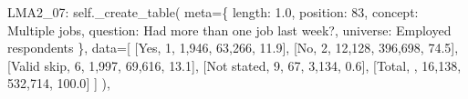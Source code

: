 \documentclass[
  11pt,
  a4paper,
]{article}
\newenvironment{Shaded}{\begin{snugshade}}{\end{snugshade}}
\newcommand{\NormalTok}[1]{\textcolor[rgb]{0.00,0.23,0.31}{#1}}
\newcommand{\OperatorTok}[1]{\textcolor[rgb]{0.37,0.37,0.37}{#1}}
\newcommand{\StringTok}[1]{\textcolor[rgb]{0.13,0.47,0.30}{#1}}
\newcommand{\VariableTok}[1]{\textcolor[rgb]{0.07,0.07,0.07}{#1}}
\begin{document}
\begin{Shaded}
\begin{Highlighting}[]
            \StringTok{\textquotesingle{}LMA2\_07\textquotesingle{}}\NormalTok{: }\VariableTok{self}\NormalTok{.\_create\_table(}
\NormalTok{                meta}\OperatorTok{=}\NormalTok{\{}
                    \StringTok{\textquotesingle{}length\textquotesingle{}}\NormalTok{: }\StringTok{\textquotesingle{}1.0\textquotesingle{}}\NormalTok{, }\StringTok{\textquotesingle{}position\textquotesingle{}}\NormalTok{: }\StringTok{\textquotesingle{}83\textquotesingle{}}\NormalTok{,}
                    \StringTok{\textquotesingle{}concept\textquotesingle{}}\NormalTok{: }\StringTok{\textquotesingle{}Multiple jobs\textquotesingle{}}\NormalTok{,}
                    \StringTok{\textquotesingle{}question\textquotesingle{}}\NormalTok{: }\StringTok{\textquotesingle{}Had more than one job last week?\textquotesingle{}}\NormalTok{,}
                    \StringTok{\textquotesingle{}universe\textquotesingle{}}\NormalTok{: }\StringTok{\textquotesingle{}Employed respondents\textquotesingle{}}
\NormalTok{                \},}
\NormalTok{                data}\OperatorTok{=}\NormalTok{[}
\NormalTok{                    [}\StringTok{\textquotesingle{}Yes\textquotesingle{}}\NormalTok{, }\StringTok{\textquotesingle{}1\textquotesingle{}}\NormalTok{, }\StringTok{\textquotesingle{}1,946\textquotesingle{}}\NormalTok{, }\StringTok{\textquotesingle{}63,266\textquotesingle{}}\NormalTok{, }\StringTok{\textquotesingle{}11.9\textquotesingle{}}\NormalTok{],}
\NormalTok{                    [}\StringTok{\textquotesingle{}No\textquotesingle{}}\NormalTok{, }\StringTok{\textquotesingle{}2\textquotesingle{}}\NormalTok{, }\StringTok{\textquotesingle{}12,128\textquotesingle{}}\NormalTok{, }\StringTok{\textquotesingle{}396,698\textquotesingle{}}\NormalTok{, }\StringTok{\textquotesingle{}74.5\textquotesingle{}}\NormalTok{],}
\NormalTok{                    [}\StringTok{\textquotesingle{}Valid skip\textquotesingle{}}\NormalTok{, }\StringTok{\textquotesingle{}6\textquotesingle{}}\NormalTok{, }\StringTok{\textquotesingle{}1,997\textquotesingle{}}\NormalTok{, }\StringTok{\textquotesingle{}69,616\textquotesingle{}}\NormalTok{, }\StringTok{\textquotesingle{}13.1\textquotesingle{}}\NormalTok{],}
\NormalTok{                    [}\StringTok{\textquotesingle{}Not stated\textquotesingle{}}\NormalTok{, }\StringTok{\textquotesingle{}9\textquotesingle{}}\NormalTok{, }\StringTok{\textquotesingle{}67\textquotesingle{}}\NormalTok{, }\StringTok{\textquotesingle{}3,134\textquotesingle{}}\NormalTok{, }\StringTok{\textquotesingle{}0.6\textquotesingle{}}\NormalTok{],}
\NormalTok{                    [}\StringTok{\textquotesingle{}Total\textquotesingle{}}\NormalTok{, }\StringTok{\textquotesingle{}\textquotesingle{}}\NormalTok{, }\StringTok{\textquotesingle{}16,138\textquotesingle{}}\NormalTok{, }\StringTok{\textquotesingle{}532,714\textquotesingle{}}\NormalTok{, }\StringTok{\textquotesingle{}100.0\textquotesingle{}}\NormalTok{]}
\NormalTok{                ]}
\NormalTok{            ),}
            

\end{Highlighting}
\end{Shaded}
\end{document}
